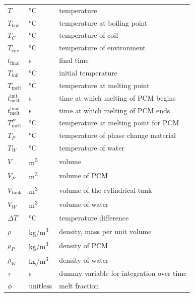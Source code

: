 \documentclass[12pt]{article}
\begin{document}
\begin{longtable*}{l l p{12cm}}
  $T$ & \si[per-mode=symbol] {\celsius} & temperature
  \\
  $T_\text{boil}$ & \si[per-mode=symbol] {\celsius} & temperature at boiling point
  \\
  $T_C$ &\si[per-mode=symbol] {\celsius} & temperature of coil
  \\
  $T_\text{env}$ & \si[per-mode=symbol] {\celsius} & temperature of environment
  \\ 
  $t_\text{final}$ & \si[per-mode=symbol] {\second} & final time
  \\ 
  $T_\text{init}$ & \si[per-mode=symbol] {\celsius} & initial temperature
  \\
  $T_\text{melt}$ & \si[per-mode=symbol] {\celsius} & temperature at melting point
  \\
  $t_\text{melt}^\text{init}$ & \si[per-mode=symbol] {\second} & time at which
                                                                 melting of PCM begins
  \\ 
  $t_\text{melt}^\text{final}$ & \si[per-mode=symbol] {\second} & time at which
                                                                 melting of PCM ends
  \\ 
  $T_\text{melt}^{P}$ & \si[per-mode=symbol] {\celsius} & temperature at melting
                                                          point for PCM
  \\
  $T_P$ & \si[per-mode=symbol] {\celsius} & temperature of phase change material
  \\
  $T_W$ & \si[per-mode=symbol] {\celsius} & temperature of water
  \\
  $V$ & \si[per-mode=symbol] {\cubic\metre} & volume
  \\
  $V_P$ & \si[per-mode=symbol] {\cubic\metre} & volume of PCM
  \\
  $V_\text{tank}$ & \si[per-mode=symbol] {\cubic\metre} & volume of the
  cylindrical tank
  \\
  $V_W$ & \si[per-mode=symbol] {\cubic\metre} & volume of water
  \\
  $\Delta T$ & \si[per-mode=symbol] {\celsius} & temperature difference
  \\
  $\rho$ & \si[per-mode=symbol] {\kilogram\per\cubic\metre} & density, mass per
  unit volume
  \\
  $\rho_P$ & \si[per-mode=symbol] {\kilogram\per\cubic\metre} & density of PCM
  \\
  $\rho_W$ & \si[per-mode=symbol] {\kilogram\per\cubic\metre} & density of water
  \\
  $\tau$ & \si[per-mode=symbol] {\second} & dummy variable for integration over time
  \\
  $\phi$ & \si[per-mode=symbol] {unitless} & melt fraction
  \\
  \bottomrule
\end{longtable*}
\end{document}
